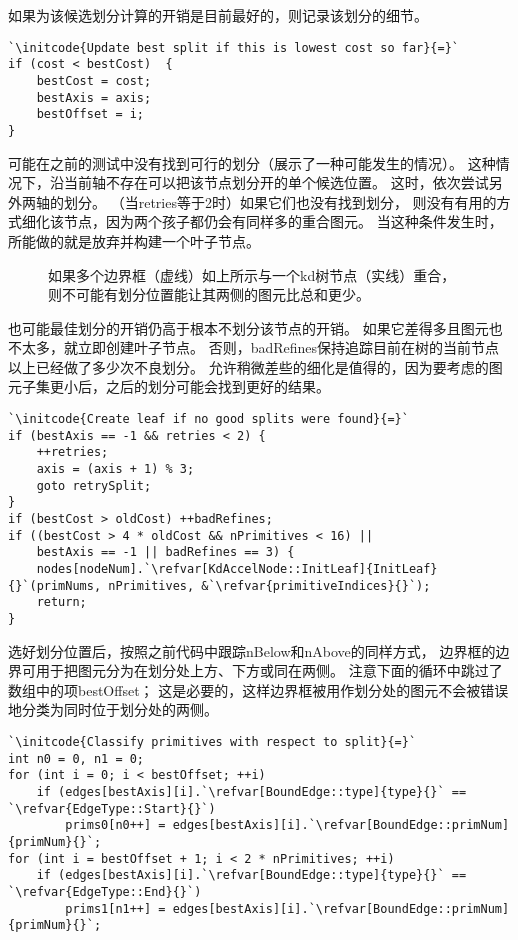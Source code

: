 如果为该候选划分计算的开销是目前最好的，则记录该划分的细节。
\begin{lstlisting}
`\initcode{Update best split if this is lowest cost so far}{=}`
if (cost < bestCost)  {
    bestCost = cost;
    bestAxis = axis;
    bestOffset = i;
}
\end{lstlisting}

可能在之前的测试中没有找到可行的划分（展示了一种可能发生的情况）。
这种情况下，沿当前轴不存在可以把该节点划分开的单个候选位置。
这时，依次尝试另外两轴的划分。
（当{\ttfamily retries}等于2时）如果它们也没有找到划分，
则没有有用的方式细化该节点，因为两个孩子都仍会有同样多的重合图元。
当这种条件发生时，所能做的就是放弃并构建一个叶子节点。
\begin{figure}[htbp]
    \centering
    \caption{如果多个边界框（虚线）如上所示与一个kd树节点（实线）重合，
    则不可能有划分位置能让其两侧的图元比总和更少。}
    \label{fig:4.16}
\end{figure}

也可能最佳划分的开销仍高于根本不划分该节点的开销。
如果它差得多且图元也不太多，就立即创建叶子节点。
否则，{\ttfamily badRefines}保持追踪目前在树的当前节点以上已经做了多少次不良划分。
允许稍微差些的细化是值得的，因为要考虑的图元子集更小后，之后的划分可能会找到更好的结果。
\begin{lstlisting}
`\initcode{Create leaf if no good splits were found}{=}`
if (bestAxis == -1 && retries < 2) {
    ++retries;
    axis = (axis + 1) % 3;
    goto retrySplit;
}
if (bestCost > oldCost) ++badRefines;
if ((bestCost > 4 * oldCost && nPrimitives < 16) || 
    bestAxis == -1 || badRefines == 3) {
    nodes[nodeNum].`\refvar[KdAccelNode::InitLeaf]{InitLeaf}{}`(primNums, nPrimitives, &`\refvar{primitiveIndices}{}`);
    return; 
}
\end{lstlisting}

选好划分位置后，按照之前代码中跟踪{\ttfamily nBelow}和{\ttfamily nAbove}的同样方式，
边界框的边界可用于把图元分为在划分处上方、下方或同在两侧。
注意下面的循环中跳过了数组中的项{\ttfamily bestOffset}；
这是必要的，这样边界框被用作划分处的图元不会被错误地分类为同时位于划分处的两侧。
\begin{lstlisting}
`\initcode{Classify primitives with respect to split}{=}`
int n0 = 0, n1 = 0;
for (int i = 0; i < bestOffset; ++i)
    if (edges[bestAxis][i].`\refvar[BoundEdge::type]{type}{}` == `\refvar{EdgeType::Start}{}`)
        prims0[n0++] = edges[bestAxis][i].`\refvar[BoundEdge::primNum]{primNum}{}`;
for (int i = bestOffset + 1; i < 2 * nPrimitives; ++i)
    if (edges[bestAxis][i].`\refvar[BoundEdge::type]{type}{}` == `\refvar{EdgeType::End}{}`)
        prims1[n1++] = edges[bestAxis][i].`\refvar[BoundEdge::primNum]{primNum}{}`;
\end{lstlisting}

